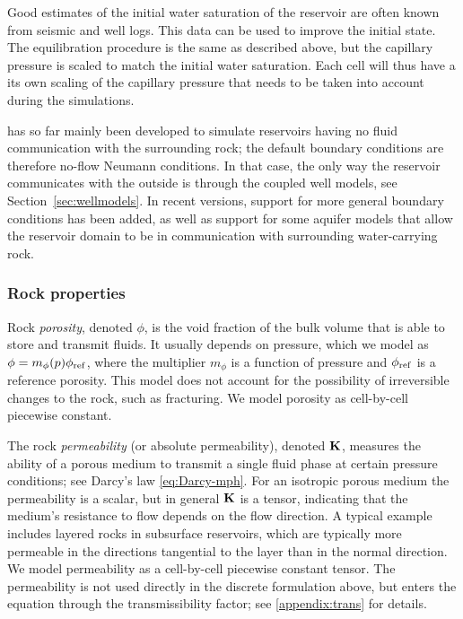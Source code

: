 Good estimates of the initial water saturation of the reservoir are often known 
from seismic and well logs. This data can be used to improve the initial state. 
The equilibration procedure is the same as described above, 
but the capillary pressure is scaled to match the initial water saturation. 
Each cell will thus have a its own scaling of the capillary pressure that 
needs to be taken into account during the simulations. 

\opmflow has so far mainly been developed to simulate reservoirs having
no fluid communication with the surrounding rock; the default boundary
conditions are therefore no-flow Neumann conditions. In that case, the
only way the reservoir communicates with the outside is through
the coupled well models, see Section~\ref{sec:wellmodels}. In recent
versions, support for more general boundary conditions has been
added, as well as support for some aquifer models that allow the
reservoir domain to be in communication with surrounding water-carrying rock.


\subsubsection{Rock properties}
\label{sec:rockprops}

{\revised Rock {\em porosity}, denoted $\phi$}, is the void fraction of the
bulk volume that is able to store and transmit fluids.
It usually depends on pressure, which we model
as $\phi = m_\phi(p)\phi_{\rm ref}$, where the multiplier $m_\phi$ is a
function of pressure and $\phi_{\rm ref}$ is a reference porosity. This model
does not account for the possibility of irreversible changes to the
rock, such as fracturing. We model porosity as cell-by-cell piecewise
constant.

{\revised The rock {\em permeability} (or absolute permeability),
denoted ${\bf K}$}, measures the ability of a porous medium to
transmit a single fluid phase at certain pressure conditions;
see Darcy's law \eqref{eq:Darcy-mph}.
For an isotropic porous medium the permeability is a scalar, but in general
${\bf K}$ is a tensor, indicating that the medium's resistance to flow
depends on the flow direction. A typical example includes layered
rocks in subsurface reservoirs, which are typically more permeable in
the directions tangential to the layer than in the normal
direction. We model permeability as a cell-by-cell piecewise constant
tensor. The permeability is not used directly in the discrete
formulation above, but enters the equation through the
transmissibility factor; see \ref{appendix:trans} for details.




